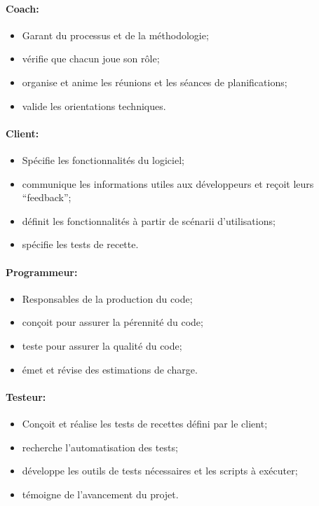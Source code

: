 \documentclass[a4paper,11pt,french]{article}
\begin{document}
\paragraph{Coach:}
\begin{itemize}
 \item Garant du processus et de la méthodologie;
 \item vérifie que chacun joue son rôle;
 \item organise et anime les réunions et les séances de planifications;
 \item valide les orientations techniques.
\end{itemize}

\paragraph{Client:}
\begin{itemize}
 \item Spécifie les fonctionnalités du logiciel;
 \item communique les informations utiles aux développeurs et reçoit leurs 
``feedback'';
 \item définit les fonctionnalités à partir de scénarii d'utilisations;
 \item spécifie les tests de recette.
\end{itemize}

\paragraph{Programmeur:}
\begin{itemize}
 \item Responsables de la production du code;
 \item conçoit pour assurer la pérennité du code;
 \item teste pour assurer la qualité du code;
 \item émet et révise des estimations de charge.
\end{itemize}

\paragraph{Testeur:}
\begin{itemize}
 \item Conçoit et réalise les tests de recettes défini par le client;
 \item recherche l'automatisation des tests;
 \item développe les outils de tests nécessaires et les scripts à exécuter;
 \item témoigne de l'avancement du projet.
\end{itemize}
\end{document}
